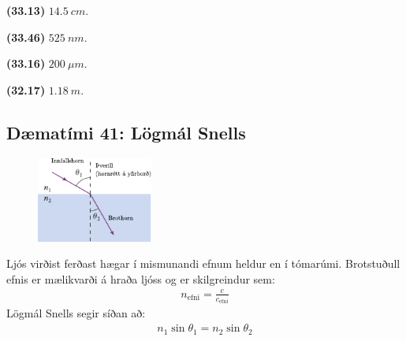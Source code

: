 \ifdefined \wholebook \else\documentclass[oneside]{book}\usepackage{EdlBook}\graphicspath{{figures/}}
\begin{document}
\begin{tcolorbox}
\begin{enumerate*}[label = ]
  \item \textbf{(33.13)} $\SI{14.5}{cm}$.
  \item \textbf{(33.46)} $\SI{525}{nm}$.
  \item \textbf{(33.16)} $\SI{200}{\mu m}$.
  \item \textbf{(32.17)} $\SI{1.18}{m}$.
\end{enumerate*}
\end{tcolorbox}

\newpage

\subsection*{Dæmatími 41: Lögmál Snells}

\begin{tcolorbox}
\begin{minipage}{\linewidth}
\begin{figure}
\includegraphics[width = 1.5in]{figures/snell.pdf}
\end{figure}
Ljós virðist ferðast hægar í mismunandi efnum heldur en í tómarúmi. Brotstuðull efnis er mælikvarði á hraða ljóss og er skilgreindur sem:
\begin{align*}
    n_{\text{efni}} = \frac{c}{c_{\text{efni}}}
\end{align*}
Lögmál Snells segir síðan að:
\begin{align*}
    n_1 \sin\theta_1 = n_2 \sin\theta_2
\end{align*}
\end{minipage}
\end{tcolorbox}
\end{document}
